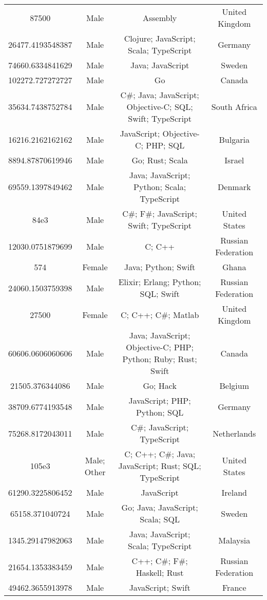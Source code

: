 \begin{center}
\begin{tabular}{ |c|c|c|c| }
87500  &  Male  &  Assembly  &  United Kingdom  \\ 
26477.4193548387  &  Male  &  Clojure; JavaScript; Scala; TypeScript  &  Germany  \\ 
74660.6334841629  &  Male  &  Java; JavaScript  &  Sweden  \\ 
102272.727272727  &  Male  &  Go  &  Canada  \\ 
35634.7438752784  &  Male  &  C\#; Java; JavaScript; Objective-C; SQL; Swift; TypeScript  &  South Africa  \\ 
16216.2162162162  &  Male  &  JavaScript; Objective-C; PHP; SQL  &  Bulgaria  \\ 
8894.87870619946  &  Male  &  Go; Rust; Scala  &  Israel  \\ 
69559.1397849462  &  Male  &  Java; JavaScript; Python; Scala; TypeScript  &  Denmark  \\ 
84e3  &  Male  &  C\#; F\#; JavaScript; Swift; TypeScript  &  United States  \\ 
12030.0751879699  &  Male  &  C; C++  &  Russian Federation  \\ 
574  &  Female  &  Java; Python; Swift  &  Ghana  \\ 
24060.1503759398  &  Male  &  Elixir; Erlang; Python; SQL; Swift  &  Russian Federation  \\ 
27500  &  Female  &  C; C++; C\#; Matlab  &  United Kingdom  \\ 
60606.0606060606  &  Male  &  Java; JavaScript; Objective-C; PHP; Python; Ruby; Rust; Swift  &  Canada  \\ 
21505.376344086  &  Male  &  Go; Hack  &  Belgium  \\ 
38709.6774193548  &  Male  &  JavaScript; PHP; Python; SQL  &  Germany  \\ 
75268.8172043011  &  Male  &  C\#; JavaScript; TypeScript  &  Netherlands  \\ 
105e3  &  Male; Other  &  C; C++; C\#; Java; JavaScript; Rust; SQL; TypeScript  &  United States  \\ 
61290.3225806452  &  Male  &  JavaScript  &  Ireland  \\ 
65158.371040724  &  Male  &  Go; Java; JavaScript; Scala; SQL  &  Sweden  \\ 
1345.29147982063  &  Male  &  Java; JavaScript; Scala; TypeScript  &  Malaysia  \\ 
21654.1353383459  &  Male  &  C++; C\#; F\#; Haskell; Rust  &  Russian Federation  \\ 
49462.3655913978  &  Male  &  JavaScript; Swift  &  France  \\ 

\end{tabular}
\end{center}
